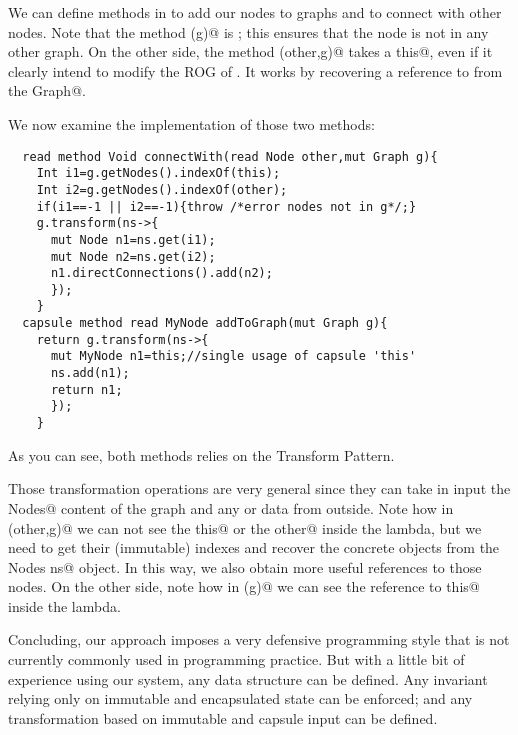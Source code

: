 We can define methods in \Q@MyNode@ to add our nodes
to graphs and to connect with other nodes.
Note that the method \Q@addToGraph(g)@ is \Q@capsule@; this ensures that the node is not in any other graph.
On the other side, the method \Q@connectWith(other,g)@ takes a \Q@read this@, even if it clearly intend to modify the ROG of \Q@this@.
It works by recovering a \Q@mut@ reference to \Q@this@ from the \Q@mut Graph@.

We now examine the implementation of those two methods:
\begin{lstlisting}
  read method Void connectWith(read Node other,mut Graph g){
    Int i1=g.getNodes().indexOf(this);
    Int i2=g.getNodes().indexOf(other);
    if(i1==-1 || i2==-1){throw /*error nodes not in g*/;}
    g.transform(ns->{
      mut Node n1=ns.get(i1);
      mut Node n2=ns.get(i2);
      n1.directConnections().add(n2);
      });
    }
  capsule method read MyNode addToGraph(mut Graph g){
    return g.transform(ns->{
      mut MyNode n1=this;//single usage of capsule 'this'
      ns.add(n1);
      return n1;
      });
    }
\end{lstlisting}
As you can see, both methods relies on the Transform Pattern.

Those transformation operations are very general since they
can take in input the \Q@mut Nodes@ content of the graph and 
any \Q@capsule@ or \Q@imm@ data from outside.
Note how in \Q@connectWith(other,g)@ we can not see the \Q@read this@ or the \Q@read other@
inside the lambda, but we need to get their (immutable) indexes 
and recover the concrete objects from the \Q@mut Nodes ns@ object.
In this way, we also obtain more useful \Q@mut@ references to those nodes.
On the other side, note how in \Q@addToGraph(g)@ we can see the reference to \Q@capsule this@ inside the lambda.

Concluding, our approach imposes a very defensive programming style
that is not currently commonly used in programming practice.
But with a little bit of experience using our system, any data structure can be defined.
Any invariant relying only on immutable and encapsulated state can be enforced; and any transformation based on immutable and capsule input can be defined.

